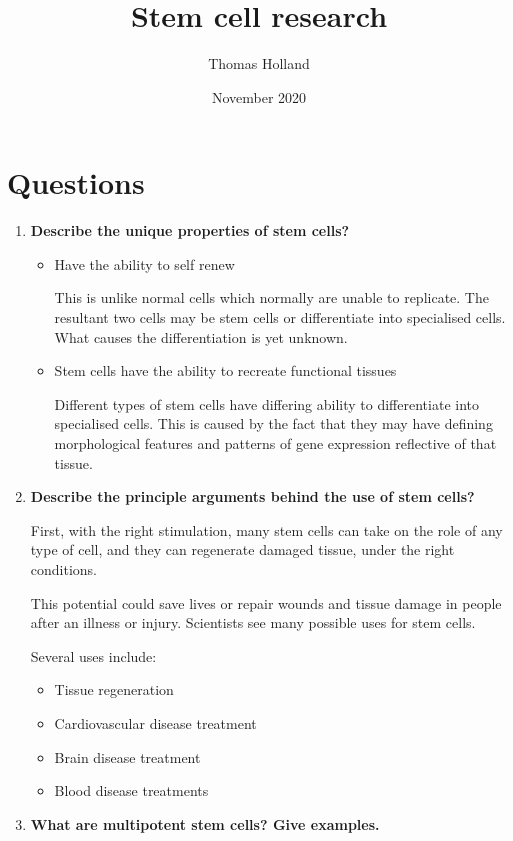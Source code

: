 \documentclass[a4paper]{article}
\title{Stem cell research}
\author{Thomas Holland}
\date{November 2020}
\begin{document}
\maketitle
\section*{Questions}
\begin{enumerate}
    \item \textbf{Describe the unique properties of stem cells? \cite{NationalInstitutesofHealth}}
    
\begin{itemize}
    \item Have the ability to self renew

This is unlike normal cells which normally are unable to replicate. The resultant two cells may be stem cells or differentiate into specialised cells. What causes the differentiation is yet unknown. 

    \item Stem cells have the ability to recreate functional tissues
    
Different types of stem cells have differing ability to differentiate into specialised cells. This is caused by the fact that they may have defining morphological features and patterns of gene expression reflective of that tissue.
\end{itemize}

    \item\textbf{ Describe the principle arguments behind the use of stem cells? \cite{YvetteBrazier2018}}

First, with the right stimulation, many stem cells can take on the role of any type of cell, and they can regenerate damaged tissue, under the right conditions.

This potential could save lives or repair wounds and tissue damage in people after an illness or injury. Scientists see many possible uses for stem cells.

Several uses include:
\begin{itemize}
    \item Tissue regeneration
    \item Cardiovascular disease treatment
    \item Brain disease treatment
    \item Blood disease treatments
\end{itemize}
    \item \textbf{What are multipotent stem cells? Give examples. \cite{IanMurnaghan}} 
    

\end{enumerate}
\end{document}
